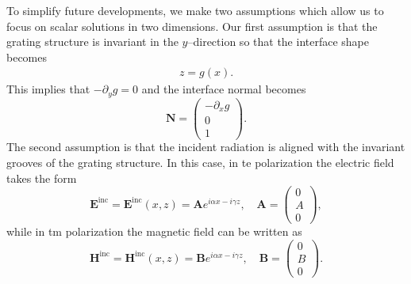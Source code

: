 To simplify future developments, we make two assumptions which allow us to focus on scalar solutions in two dimensions. Our first assumption is that the grating structure is invariant in the $y$--direction so that the interface shape becomes
\begin{align*}z=g(x).\end{align*}
This implies that $-\partial_y g=0$ and the interface normal becomes
\vspace{-0.2mm}
\begin{equation}
\textbf{N}=\begin{pmatrix}
-\partial_x g\\ 0 \\ 1
\end{pmatrix}.
\end{equation}
The second assumption is that the incident radiation is aligned with the invariant grooves of the grating structure. In this case, in \gls{te} polarization the electric field takes the form
\begin{equation}
\textbf{E}^{\text{inc}}=\textbf{E}^{\text{inc}}(x,z)=\textbf{A}e^{i\alpha x - i\gamma z},\quad \textbf{A}= 
\begin{pmatrix}
0\\ A \\ 0
\end{pmatrix},
\end{equation}
while in \gls{tm} polarization the magnetic field can be written as
\begin{equation}
\textbf{H}^{\text{inc}}=\textbf{H}^{\text{inc}}(x,z)=\textbf{B}e^{i\alpha x - i\gamma z},\quad \textbf{B}= 
\begin{pmatrix}
0\\ B \\ 0
\end{pmatrix}.
\end{equation}